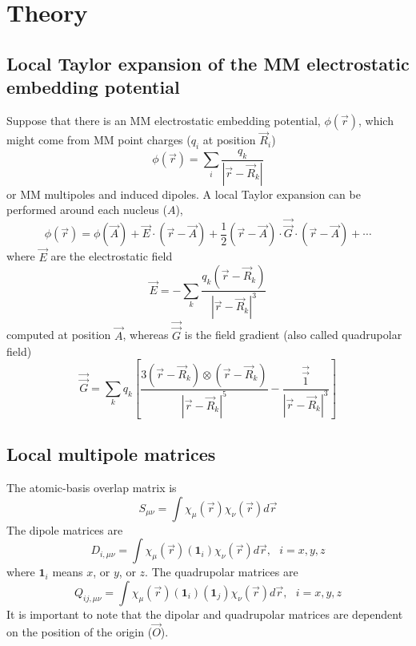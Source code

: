 \documentclass[aip,jcp,preprint,superscriptaddress,amsmath,amssymb]{revtex4-1}
\begin{document}
\section{Theory}

\subsection{Local Taylor expansion of the MM electrostatic embedding potential}

Suppose that there is an MM electrostatic embedding potential, $\phi(\vec{r})$, 
which might come from MM point charges ($q_i$ at position $\vec{R}_i$) 
\begin{equation}
\phi(\vec{r}) = \sum_i  \frac{q_k} { | \vec{r} - \vec{R}_k | } 
\end{equation}
or MM multipoles and induced dipoles.   
A local Taylor expansion can be performed around each nucleus ($A$), 
\begin{equation}
\phi(\vec{r}) = \phi(\vec{A}) + \vec{E} \cdot (\vec{r} - \vec{A} ) + \frac{1}{2} (\vec{r} - \vec{A} ) \cdot \vec{\vec{G}} \cdot (\vec{r} - \vec{A} ) + \cdots 
\label{eq:taylor-phi}
\end{equation}
where $\vec{E}$ are the electrostatic field
\begin{equation}
\vec{E} = - \sum_k \frac{q_k (\vec{r} - \vec{R}_k ) } { | \vec{r} - \vec{R}_k |^3 }  
\end{equation}
computed at position $\vec{A}$, 
whereas $\vec{\vec{G}}$ is the field gradient (also called quadrupolar field)
\begin{equation}
\vec{\vec{G}} =  \sum_k q_k \left[ \frac{ 3  (\vec{r} - \vec{R}_k )  \otimes (\vec{r} - \vec{R}_k ) } { | \vec{r} - \vec{R}_k |^5 }  -   \frac{ \vec{\vec{1}} } { | \vec{r} - \vec{R}_k |^3} \right]    
\end{equation}

\subsection{Local multipole matrices}

The atomic-basis overlap matrix is 
\begin{equation}
S_{\mu \nu} = \int \chi_{\mu} (\vec{r} ) \chi_{\nu} (\vec{r}) d \vec{r} 
\label{eq:mol-overlap}
\end{equation}
The dipole matrices are
\begin{equation}
D_{i, \mu \nu} = \int \chi_{\mu} (\vec{r} ) (\mathbf{1}_i ) \chi_{\nu} (\vec{r}) d \vec{r}, ~~~i=x, y, z
\label{eq:mol-dipole}
\end{equation}
where $\mathbf{1}_i$ means $x$, or $y$, or $z$.   The quadrupolar matrices are
\begin{equation}
Q_{ij, \mu \nu} = \int \chi_{\mu} (\vec{r} ) (\mathbf{1}_i )(\mathbf{1}_j) \chi_{\nu} (\vec{r}) d \vec{r}, ~~~i=x, y, z    
\label{eq:mol-quadrupole}
\end{equation}
It is important to note that the dipolar and quadrupolar matrices are dependent on the position of the origin ($\vec{O}$).  
\end{document}
